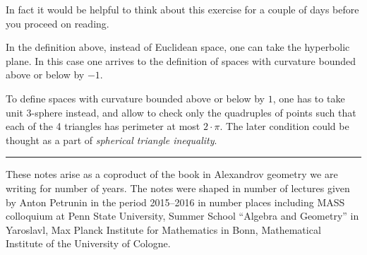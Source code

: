 In fact it would be helpful to think about this exercise for a couple of days before you proceed on reading.

In the definition above, 
instead of Euclidean space, 
one can take the hyperbolic plane.
In this case
one arrives to the definition of spaces with curvature bounded above or below by $-1$.

To define spaces with curvature bounded above or below by $1$,
one has to take unit 3-sphere instead,
and allow to check only the quadruples of points such that each of the 4 triangles has perimeter at most $2\cdot\pi$.
The later condition could be thought as a part of \emph{spherical triangle inequality}.

\medskip
\noindent\rule{2cm}{0.4pt}

These notes arise as a coproduct of the book in Alexandrov geometry
we are writing for number of years.
The notes were shaped in number of lectures given by Anton Petrunin in the period 2015--2016
in number places including 
MASS colloquium at Penn State University, 
Summer School ``Algebra and Geometry''  in Yaroslavl,
Max Planck Institute for Mathematics in Bonn,
Mathematical Institute of the University of Cologne.








